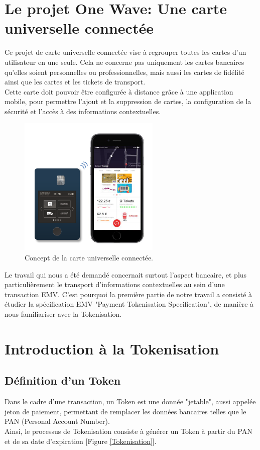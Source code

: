 \documentclass{report}
\begin{document}
\section{Le projet One Wave: Une carte universelle connectée}
Ce projet de carte universelle connectée vise à regrouper toutes les cartes d'un utilisateur en une seule. Cela ne concerne pas uniquement les cartes bancaires qu'elles soient personnelles ou professionnelles, mais aussi les cartes de fidélité ainsi que les cartes et les tickets de transport.\\
Cette carte doit pouvoir être configurée à distance grâce à une application mobile, pour permettre l'ajout et la suppression de cartes, la configuration de la sécurité et l'accès à des informations contextuelles.

\begin{figure}[!h]
    \centering
			\includegraphics[scale=0.5]{img/carte.png}
			\caption{\label{Carte} Concept de la carte universelle connectée.}			
\end{figure}

Le travail qui nous a été demandé concernait surtout l'aspect bancaire, et plus particulièrement le transport d'informations contextuelles au sein d'une transaction EMV. C'est pourquoi la première partie de notre travail a consisté à étudier la spécification EMV "Payment Tokenisation Specification", de manière à nous familiariser avec la Tokenisation.


\section{Introduction à la Tokenisation}
\subsection{Définition d'un Token}
Dans le cadre d'une transaction, un Token est une donnée "jetable", aussi appelée jeton de paiement, permettant de remplacer les données bancaires telles que le PAN (Personal Account Number).\\
Ainsi, le processus de Tokenisation consiste à générer un Token à partir du PAN et de sa date d'expiration [Figure \ref{Tokenisation}].
\end{document}
